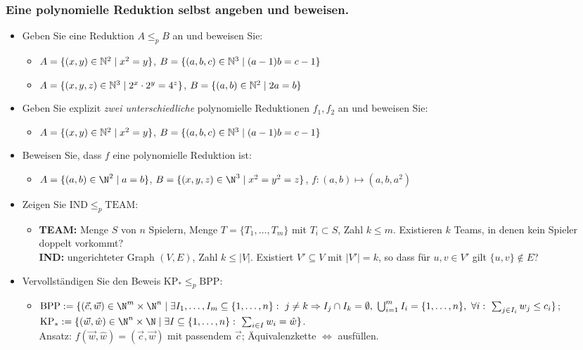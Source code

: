 \subsubsection{Eine polynomielle Reduktion selbst angeben und beweisen.}
\begin{itemize}
    \item Geben Sie eine Reduktion $A\le_p B$ an und beweisen Sie:
    \begin{itemize}
        \item  $A=\{(x,y)\in\mathbb{N}^2\mid x^2=y\}$, $B=\{(a,b,c)\in\mathbb{N}^3\mid (a-1)b=c-1\}$ 
        \item  $A=\{(x,y,z)\in\mathbb{N}^3\mid 2^x\cdot 2^y=4^z\}$, $B=\{(a,b)\in\mathbb{N}^2\mid 2a=b\}$ 
    \end{itemize}
    \item Geben Sie explizit \emph{zwei unterschiedliche} polynomielle Reduktionen $f_1,f_2$ an und beweisen Sie:
    \begin{itemize}
        \item  $A=\{(x,y)\in\mathbb{N}^2\mid x^2=y\}$, $B=\{(a,b,c)\in\mathbb{N}^3\mid (a-1)b=c-1\}$ 
    \end{itemize}
    \item Beweisen Sie, dass $f$ eine polynomielle Reduktion ist:
    \begin{itemize}
        \item  $A=\{(a,b)\in\N^2\mid a=b\}$, $B=\{(x,y,z)\in\N^3\mid x^2=y^2=z\}$, $f:(a,b)\mapsto(a,b,a^2)$ 
    \end{itemize}
    \item Zeigen Sie $\mathrm{IND}\le_p\mathrm{TEAM}$:
    \begin{itemize}
        \item \textbf{TEAM:} Menge $S$ von $n$ Spielern, Menge $T=\{T_1,\dots,T_m\}$ mit $T_i\subset S$, 
        Zahl $k\le m$. Existieren $k$ Teams, in denen kein Spieler doppelt vorkommt?\\
        \textbf{IND:} ungerichteter Graph $(V,E)$, Zahl $k\le|V|$. Existiert $V'\subseteq V$ mit $|V'|=k$,
        so dass für $u,v\in V'$ gilt $\{u,v\}\notin E$?
    \end{itemize}
    \item Vervollständigen Sie den Beweis $\mathrm{KP}_*\le_p\mathrm{BPP}$:
    \begin{itemize}
        \item
        $\mathrm{BPP}:=\{(\vec c,\vec w)\in\N^m\times\N^n\mid \exists I_1,\dots,I_m\subseteq\{1,\dots,n\}:\ j\ne k\Rightarrow I_j\cap I_k=\emptyset,\ \bigcup_{i=1}^m I_i=\{1,\dots,n\},\ \forall i:\ \sum_{j\in I_i}w_j\le c_i\}$;\\
        $\mathrm{KP}_*:=\{(\vec w,\hat w)\in\N^n\times\N\mid \exists I\subseteq\{1,\dots,n\}:\ \sum_{i\in I}w_i=\hat w\}$.\\
        Ansatz: $f(\vec w,\hat w)=(\vec c,\vec w)$ mit passendem $\vec c$; Äquivalenzkette $\Leftrightarrow$
        ausfüllen. \\  \quad {}
    \end{itemize}
\end{itemize}


